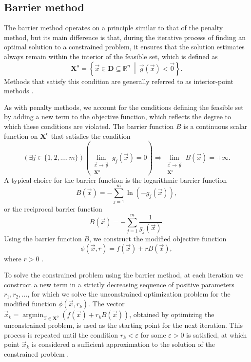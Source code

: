 \subsection{Barrier method}\label{barrier method}
The barrier method operates on a principle similar to that of the penalty method, but its main difference is that, during the iterative process of finding an optimal solution to a constrained problem, it ensures that the solution estimates always remain within the interior of the feasible set, which is defined as
\begin{equation}
	\mathbf{X}^{\mathrm{o}} = \left\{ \vec{x} \in \mathbf{D} \subseteq \mathbb{R}^n \ \middle| \ \vec{g}(\vec{x}) < \vec{0} \right\}.
\end{equation}
Methods that satisfy this condition are generally referred to as interior-point methods \cite{non-linear-textbook}.

As with penalty methods, we account for the conditions defining the feasible set by adding a new term to the objective function, which reflects the degree to which these conditions are violated. The barrier function $ B $ is a continuous scalar function on $ \mathbf{X}^{\mathrm{o}} $ that satisfies the condition
\begin{equation}
	(\exists j \in \{1,2,\dots,m\})(\lim\limits_{\substack{\vec{x} \to \vec{y} \\ \mathbf{X}^{\mathrm{o}}}} g_j (\vec{x}) = 0) \Rightarrow \lim\limits_{\substack{\vec{x} \to \vec{y} \\ \mathbf{X}^{\mathrm{o}}}} B (\vec{x}) = + \infty.
\end{equation}
A typical choice for the barrier function is the logarithmic barrier function
\begin{equation}\label{eq:log barrier function}
	B (\vec{x}) = -\sum_{j=1}^{m} \ln \left( - g_j (\vec{x}) \right),
\end{equation}
or the reciprocal barrier function
\begin{equation}\label{eq:reciprocal barrier function}
	B (\vec{x}) = -\sum_{j=1}^{m} \frac{1}{g_j (\vec{x})}.
\end{equation}
Using the barrier function $ B $, we construct the modified objective function
\begin{equation}\label{eq:cost function with barrier}
	\phi (\vec{x}, r) = f (\vec{x}) + r B(\vec{x}),
\end{equation}
where $ r > 0 $ \cite{non-linear-textbook}.

To solve the constrained problem using the barrier method, at each iteration we construct a new term in a strictly decreasing sequence of positive parameters $ r_1, r_2, \dots$, for which we solve the unconstrained optimization problem for the modified function $ \phi (\vec{x}, r_k)$. The vector $ \vec{x}_k  = \operatorname*{argmin}_{\vec{x} \in \mathbf{X}^\mathrm{o}} (f(\vec{x}) + r_k B(\vec{x})) $, obtained by optimizing the unconstrained problem, is used as the starting point for the next iteration. This process is repeated until the condition $ r_k < \varepsilon$ for some $ \varepsilon > 0$ is satisfied, at which point $ \vec{x}_k $ is considered a sufficient approximation to the solution of the constrained problem \cite{non-linear-textbook}.

